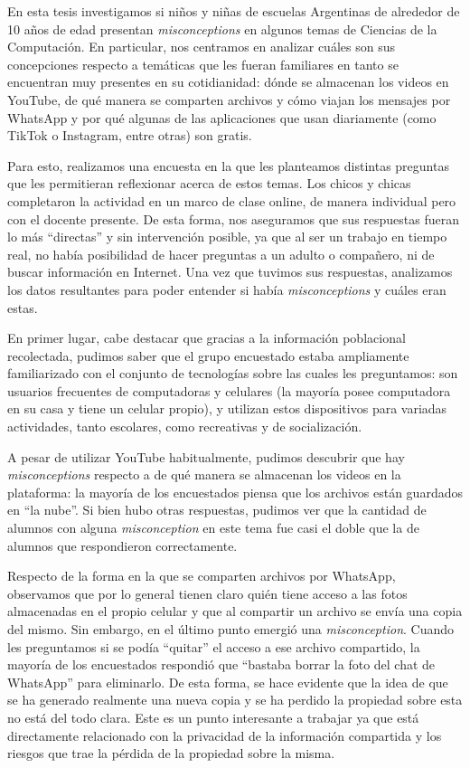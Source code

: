 En esta tesis investigamos si niños y niñas de escuelas Argentinas de alrededor de 10 años de edad presentan \textit{misconceptions} en algunos temas de Ciencias de la Computación. En particular, nos centramos en analizar cuáles son sus concepciones respecto a temáticas que les fueran familiares en tanto se encuentran muy presentes en su cotidianidad: dónde se almacenan los videos en YouTube, de qué manera se comparten archivos y cómo viajan los mensajes por WhatsApp y por qué algunas de las aplicaciones que usan diariamente (como TikTok o Instagram, entre otras) son gratis.

Para esto, realizamos una encuesta en la que les planteamos distintas preguntas que les permitieran reflexionar acerca de estos temas. Los chicos y chicas completaron la actividad en un marco de clase online, de manera individual pero con el docente presente. De esta forma, nos aseguramos que sus respuestas fueran lo más “directas” y sin intervención posible, ya que al ser un trabajo en tiempo real, no había posibilidad de hacer preguntas a un adulto o compañero, ni de buscar información en Internet. Una vez que tuvimos sus respuestas, analizamos los datos resultantes para poder entender si había \textit{misconceptions} y cuáles eran estas.

En primer lugar, cabe destacar que gracias a la información poblacional recolectada, pudimos saber que el grupo encuestado estaba ampliamente familiarizado con el conjunto de tecnologías sobre las cuales les preguntamos: son usuarios frecuentes de computadoras y celulares (la mayoría posee computadora en su casa y tiene un celular propio), y utilizan estos dispositivos para variadas actividades, tanto escolares, como recreativas y de socialización. 

A pesar de utilizar YouTube habitualmente, pudimos descubrir que hay \textit{misconceptions} respecto a de qué manera se almacenan los videos en la plataforma: la mayoría de los encuestados piensa que los archivos están guardados en “la nube”. Si bien hubo otras respuestas, pudimos ver que la cantidad de alumnos con alguna \textit{misconception} en este tema fue casi el doble que la de alumnos que respondieron correctamente.

Respecto de la forma en la que se comparten archivos por WhatsApp, observamos que por lo general tienen claro quién tiene acceso a las fotos almacenadas en el propio celular y que al compartir un archivo se envía una copia del mismo. Sin embargo, en el último punto emergió una \textit{misconception}. Cuando les preguntamos si se podía “quitar” el acceso a ese archivo compartido, la mayoría de los encuestados respondió que “bastaba borrar la foto del chat de WhatsApp” para eliminarlo. De esta forma, se hace evidente que la idea de que se ha generado realmente una nueva copia y se ha perdido la propiedad sobre esta no está del todo clara. Este es un punto interesante a trabajar ya que está directamente relacionado con la privacidad de la información compartida y los riesgos que trae la pérdida de la propiedad sobre la misma.

